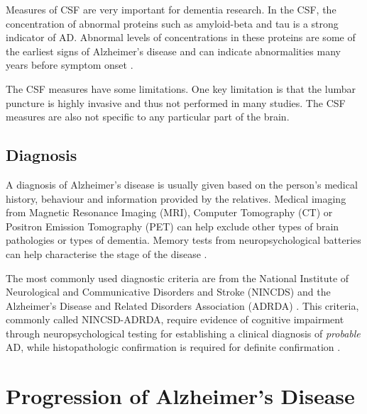 Measures of CSF are very important for dementia research. In the CSF, the concentration of abnormal proteins such as amyloid-beta and tau is a strong indicator of AD. Abnormal levels of concentrations in these proteins are some of the earliest signs of Alzheimer's disease and can indicate abnormalities many years before symptom onset \cite{jack2010hypothetical}.

The CSF measures have some limitations. One key limitation is that the lumbar puncture is highly invasive and thus not performed in many studies. The CSF measures are also not specific to any particular part of the brain.

\subsection{Diagnosis}
\label{sec:bckDia}

A diagnosis of Alzheimer's disease is usually given based on the person's medical history, behaviour and information provided by the relatives. Medical imaging from Magnetic Resonance Imaging (MRI), Computer Tomography (CT) or Positron Emission Tomography (PET) can help exclude other types of brain pathologies or types of dementia. Memory tests from neuropsychological batteries can help characterise the stage of the disease \cite{waldemar2007recommendations}.

The most commonly used diagnostic criteria are from the National Institute of Neurological and Communicative Disorders and Stroke (NINCDS) and the Alzheimer's Disease and Related Disorders Association (ADRDA) \cite{dubois2007research,dubois2010revising}. This criteria, commonly called NINCSD-ADRDA, require evidence of cognitive impairment through neuropsychological testing for establishing a clinical diagnosis of \emph{probable} AD, while histopathologic confirmation is required for definite confirmation \cite{dubois2007research,dubois2010revising}.


\section{Progression of Alzheimer's Disease}
\label{sec:bckProgAd}

